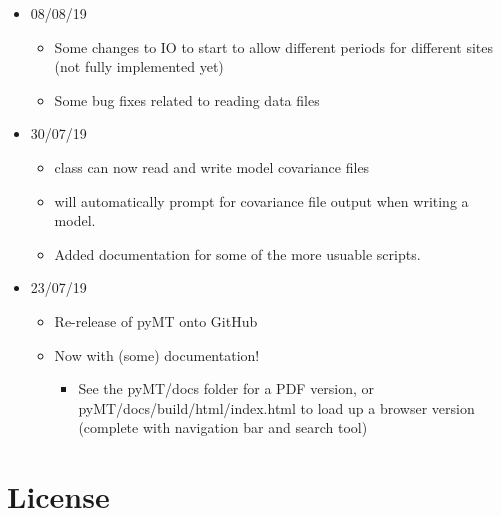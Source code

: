 \documentclass[letterpaper,10pt,english]{sphinxmanual}
\begin{document}
\begin{itemize}
\begin{itemize}
\begin{itemize}
\end{itemize}

\end{itemize}

\item {} 
08/08/19
\begin{itemize}
\item {} 
Some changes to IO to start to allow different periods for different sites (not fully implemented yet)

\item {} 
Some bug fixes related to reading data files

\end{itemize}

\item {} 
30/07/19
\begin{itemize}
\item {} 
{\hyperref[\detokenize{content/api_core/data_structures:model}]{}} class can now read and write model covariance files

\item {} 
{\hyperref[\detokenize{content/mesh_designer/main_window:mesh-designer}]{}} will automatically prompt for covariance file output when writing a model.

\item {} 
Added documentation for some of the more usuable scripts.

\end{itemize}

\item {} 
23/07/19
\begin{itemize}
\item {} 
Re-release of pyMT onto GitHub

\item {} 
Now with (some) documentation!
\begin{itemize}
\item {} 
See the pyMT/docs folder for a PDF version, or pyMT/docs/build/html/index.html to load up a browser version (complete with navigation bar and search tool)

\end{itemize}

\end{itemize}

\end{itemize}


\section{License}
\label{\detokenize{index:license}}
\end{document}

